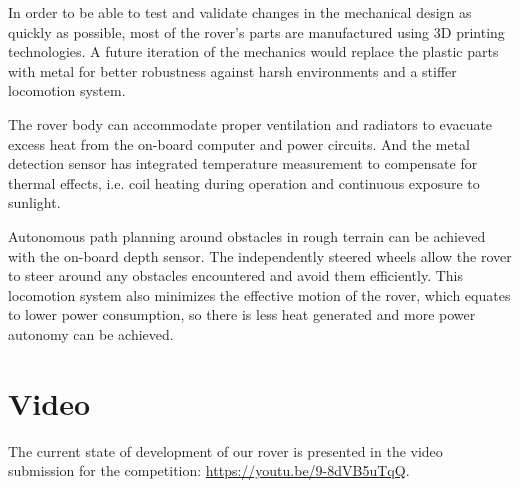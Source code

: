 In order to be able to test and validate changes in the mechanical design as quickly as possible, most of the rover's parts are manufactured using 3D printing technologies.
A future iteration of the mechanics would replace the plastic parts with metal for better robustness against harsh environments and a stiffer locomotion system.

The rover body can accommodate proper ventilation and radiators to evacuate excess heat from the on-board computer and power circuits.
And the metal detection sensor has integrated temperature measurement to compensate for thermal effects, i.e. coil heating during operation and continuous exposure to sunlight.

Autonomous path planning around obstacles in rough terrain can be achieved with the on-board depth sensor.
The independently steered wheels allow the rover to steer around any obstacles encountered and avoid them efficiently.
This locomotion system also minimizes the effective motion of the rover, which equates to lower power consumption, so there is less heat generated and more power autonomy can be achieved.

\section{Video}
The current state of development of our rover is presented in the video submission for the competition: \url{https://youtu.be/9-8dVB5uTqQ}.
